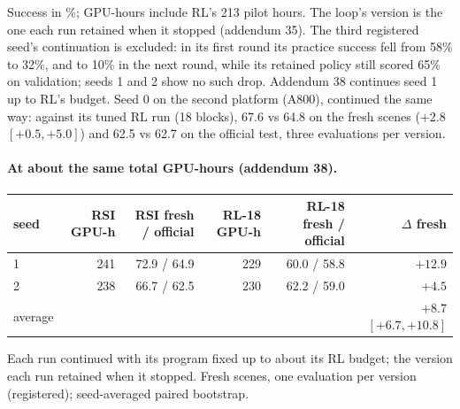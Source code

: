 \begin{center}\footnotesize\setlength{\tabcolsep}{3pt}
\end{center}
Success in \%; GPU-hours include RL's 213 pilot hours. The loop's version is the one each run retained when it stopped (addendum 35). The third registered seed's continuation is excluded: in its first round its practice success fell from 58\% to 32\%, and to 10\% in the next round, while its retained policy still scored 65\% on validation; seeds 1 and 2 show no such drop. Addendum 38 continues seed 1 up to RL's budget.
 Seed 0 on the second platform (A800), continued the same way: against its tuned RL run (18 blocks), 67.6 vs 64.8 on the fresh scenes ($+2.8$ $[+0.5, +5.0]$) and 62.5 vs 62.7 on the official test, three evaluations per version.

\paragraph{At about the same total GPU-hours (addendum 38).}
\begin{center}\footnotesize\setlength{\tabcolsep}{4pt}
\begin{tabular}{@{}lrrrrr@{}}
\toprule
seed & RSI GPU-h & RSI fresh / official & RL-18 GPU-h & RL-18 fresh / official & $\Delta$ fresh \\
\midrule
1 & 241 & 72.9 / 64.9 & 229 & 60.0 / 58.8 & $+12.9$ \\
2 & 238 & 66.7 / 62.5 & 230 & 62.2 / 59.0 & $+4.5$ \\
\midrule
average & & & & & $+8.7$ $[+6.7, +10.8]$ \\
\bottomrule
\end{tabular}
\end{center}
Each run continued with its program fixed up to about its RL budget; the version each run retained when it stopped. Fresh scenes, one evaluation per version (registered); seed-averaged paired bootstrap.
